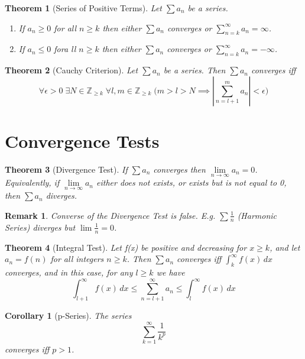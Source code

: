 \documentclass[11pt, oneside]{book}
\theoremstyle{break}
\newtheorem{thm}{Theorem}[section]
\newtheorem{crly}{Corollary}[thm]
\newtheorem*{remark}{Remark}
\newcommand{\bb}[1]{\mathbb{#1}}			%
\begin{document}
\begin{thm}[Series of Positive Terms]
	Let $\sum a_n$ be a series.
	\begin{enumerate}
		\item If $a_n \geq 0$ for all $n \geq k$ then either $\sum a_n$ converges or $\sum\limits_{n = k}^{\infty} a_n = \infty$.
		\item If $a_n \leq 0$ fora ll $n \geq k$ then either $\sum a_n$ converges or $\sum\limits_{n = k}^{\infty} a_n = -\infty$.
	\end{enumerate}
\end{thm}

\begin{thm}[Cauchy Criterion]
	Let $\sum a_n$ be a series. Then $\sum a_n$ converges iff
	\[
		\forall \epsilon > 0 \; \exists N \in \bb{Z}_{\geq k} \; \forall l, m \in \bb{Z}_{\geq k} \; \Bigg(m > l > N \implies \left|\sum_{n = l +1}^{m} a_n \right| < \epsilon \Bigg)
	\]
\end{thm}


\section{Convergence Tests}

\begin{thm}[Divergence Test]
	If $\sum a_n$ converges then $\lim\limits_{n \to \infty} a_n = 0$. Equivalently, if $\lim\limits_{n \to \infty} a_n$ either does not exists, or exists but is not equal to 0, then $\sum a_n$ diverges.
\end{thm}

\begin{remark}
	Converse of the Divergence Test is false. E.g. $\sum \frac{1}{n}$ (Harmonic Series) diverges but $\lim\limits \frac{1}{n} = 0$.
\end{remark}

\begin{thm}[Integral Test]
	Let f(x) be positive and decreasing for $x \geq k$, and let $a_n = f(n)$ for all integers $n \geq k$. Then $\sum a_n$ converges iff $\int_{k}^{\infty} f(x) \, dx$ converges, and in this case, for any $l \geq k$ we have
	\[
		\int_{l + 1}^{\infty} f(x) \, dx \leq \sum_{n = l + 1}^{\infty} a_n \leq \int_{l}^{\infty} f(x) \, dx
	\]
\end{thm}

\begin{crly}[p-Series]
	The series
	\[
		\sum_{k = 1}^{\infty} \frac{1}{k^p}
	\]
	converges iff $p > 1$.
\end{crly}
\end{document}
